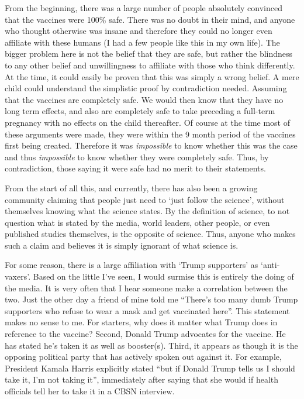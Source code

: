 \documentclass[10pt, a4paper, twocolumn]{book}
\begin{document}
From the beginning, there was a large number of people absolutely convinced that the vaccines were 100\% safe. There was no doubt in their mind, and anyone who thought otherwise was insane and therefore they could no longer even affiliate with these humans (I had a few people like this in my own life). The bigger problem here is not the belief that they are safe, but rather the blindness to any other belief and unwillingness to affiliate with those who think differently. At the time, it could easily be proven that this was simply a wrong belief. A mere child could understand the simplistic proof by contradiction needed. Assuming that the vaccines are completely safe. We would then know that they have no long term effects, and also are completely safe to take preceding a full-term pregnancy with no effects on the child thereafter. Of course at the time most of these arguments were made, they were within the 9 month period of the vaccines first being created. Therefore it was \textit{impossible} to know whether this was the case and thus \textit{impossible} to know whether they were completely safe. Thus, by contradiction, those saying it were safe had no merit to their statements. 

From the start of all this, and currently, there has also been a growing community claiming that people just need to `just follow the science', without themselves knowing what the science states. By the definition of science, to not question what is stated by the media, world leaders, other people, or even published studies themselves, is the opposite of science. Thus, anyone who makes such a claim and believes it is simply ignorant of what science is. 

For some reason, there is a large affiliation with `Trump supporters' as `anti-vaxers'. Based on the little I've seen, I would surmise this is entirely the doing of the media. It is very often that I hear someone make a correlation between the two. Just the other day a friend of mine told me ``There's too many dumb Trump supporters who refuse to wear a mask and get vaccinated here''. This statement makes no sense to me. For starters, why does it matter what Trump does in reference to the vaccine? Second, Donald Trump advocates for the vaccine. He has stated he's taken it as well as booster(s). Third, it appears as though it is the opposing political party that has actively spoken out against it. For example, President Kamala Harris explicitly stated ``but if Donald Trump tells us I should take it, I'm not taking it'', immediately after saying that she would if health officials tell her to take it in a CBSN interview.
\end{document}
